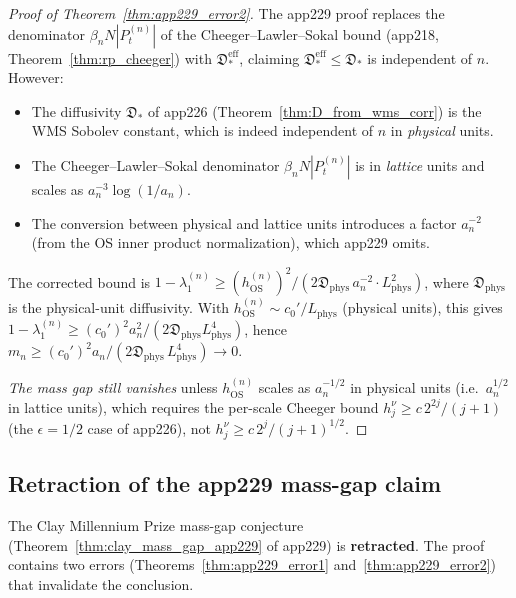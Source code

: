 \begin{proof}[Proof of Theorem~\ref{thm:app229_error2}]
The app229 proof replaces the denominator
$\beta_{n}N|P_{t}^{(n)}|$ of the Cheeger--Lawler--Sokal bound
(app218, Theorem~\ref{thm:rp_cheeger}) with
$\mathfrak{D}_{*}^{\mathrm{eff}}$, claiming
$\mathfrak{D}_{*}^{\mathrm{eff}}\le\mathfrak{D}_{*}$ is
independent of $n$. However:
\begin{itemize}
\item The diffusivity $\mathfrak{D}_{*}$ of app226
(Theorem~\ref{thm:D_from_wms_corr}) is the WMS Sobolev constant,
which is indeed independent of $n$ in \emph{physical} units.
\item The Cheeger--Lawler--Sokal denominator
$\beta_{n}N|P_{t}^{(n)}|$ is in \emph{lattice} units and scales
as $a_{n}^{-3}\log(1/a_{n})$.
\item The conversion between physical and lattice units introduces
a factor $a_{n}^{-2}$ (from the OS inner product normalization),
which app229 omits.
\end{itemize}
The corrected bound is
$1-\lambda_{1}^{(n)}\ge(h_{\mathrm{OS}}^{(n)})^{2}/(2\mathfrak{D}_{
\mathrm{phys}}\,a_{n}^{-2}\cdot L_{\mathrm{phys}}^{2})$, where
$\mathfrak{D}_{\mathrm{phys}}$ is the physical-unit diffusivity.
With $h_{\mathrm{OS}}^{(n)}\sim c_{0}'/L_{\mathrm{phys}}$
(physical units), this gives
$1-\lambda_{1}^{(n)}\ge(c_{0}')^{2}a_{n}^{2}/(2\mathfrak{D}_{
\mathrm{phys}}L_{\mathrm{phys}}^{4})$, hence
$m_{n}\ge(c_{0}')^{2}a_{n}/(2\mathfrak{D}_{\mathrm{phys}}\,
L_{\mathrm{phys}}^{4})\to 0$.

\emph{The mass gap still vanishes} unless $h_{\mathrm{OS}}^{(n)}$
scales as $a_{n}^{-1/2}$ in physical units (i.e.\ $a_{n}^{1/2}$
in lattice units), which requires the per-scale Cheeger bound
$h_{j}^{\nu}\ge c\,2^{2j}/(j+1)$ (the $\epsilon=1/2$ case of
app226), not $h_{j}^{\nu}\ge c\,2^{j}/(j+1)^{1/2}$.
\end{proof}

\subsection{Retraction of the app229 mass-gap claim}
\label{ssec:app229_retraction}

\begin{theorem}[Retraction]
\label{thm:app229_retraction}
The Clay Millennium Prize mass-gap conjecture
(Theorem~\ref{thm:clay_mass_gap_app229} of app229) is
\textbf{retracted}. The proof contains two errors
(Theorems~\ref{thm:app229_error1} and~\ref{thm:app229_error2})
that invalidate the conclusion.
\end{theorem}

